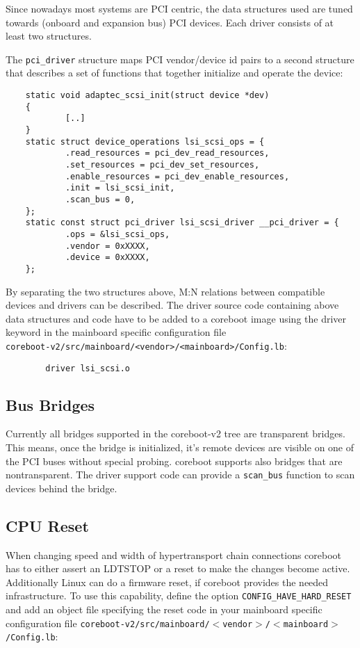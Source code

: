 \documentclass[titlepage,12pt]{article}
\begin{document}
Since nowadays most systems are PCI centric, the data structures used
are tuned towards (onboard and expansion bus) PCI devices. Each driver
consists of at least two structures.

The \texttt{pci\_driver} structure maps PCI vendor/device id pairs to a
second structure that describes a set of functions that together
initialize and operate the device:

\begin{verbatim}
    static void adaptec_scsi_init(struct device *dev)
    {
            [..]
    }
    static struct device_operations lsi_scsi_ops = {
            .read_resources = pci_dev_read_resources,
            .set_resources = pci_dev_set_resources,
            .enable_resources = pci_dev_enable_resources,
            .init = lsi_scsi_init,
            .scan_bus = 0,
    };
    static const struct pci_driver lsi_scsi_driver __pci_driver = {
            .ops = &lsi_scsi_ops,
            .vendor = 0xXXXX,
            .device = 0xXXXX,
    };
\end{verbatim}

By separating the two structures above, M:N relations between compatible
devices and drivers can be described. The driver source code containing
above data structures and code have to be added to a coreboot image
using the driver keyword in the mainboard specific configuration file \\
\texttt{coreboot-v2/src/mainboard/<vendor>/<mainboard>/Config.lb}:

\begin{verbatim}
        driver lsi_scsi.o
\end{verbatim}

\subsection{Bus Bridges}

Currently all bridges supported in the coreboot-v2 tree are transparent
bridges. This means, once the bridge is initialized, it's remote devices
are visible on one of the PCI buses without special probing. coreboot
supports also bridges that are nontransparent.  The driver support code
can provide a \texttt{scan\_bus} function to scan devices behind the bridge.

\subsection{CPU Reset}
When changing speed and width of hypertransport chain connections
coreboot has to either assert an LDTSTOP or a reset to make the changes
become active.  Additionally Linux can do a firmware reset, if coreboot
provides the needed infrastructure. To use this capability, define the
option \texttt{CONFIG\_HAVE\_HARD\_RESET} and add an object file specifying the
reset code in your mainboard specific configuration file
\texttt{coreboot-v2/src/mainboard/$<$vendor$>$/$<$mainboard$>$/Config.lb}:
\end{document}

